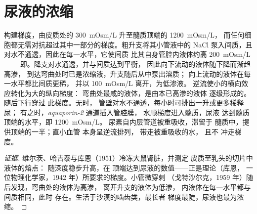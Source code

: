 \section{尿液的浓缩}

\begin{proposition}[逆流倍增]\label{prop:b3:renal-osmoregulation:countercurrent}
构建梯度，由皮质处的 \qty{300}{mOsm/L}
升至髓质顶端的 \qty{1200}{mOsm/L}，
而任何细胞都无需对抗超过其中一部分的梯度。粗升支将其小管液中的 NaCl
泵入间质，且对水不通透，因此在每一水平，它使间质
比其自身管腔内液体约高 \qty{200}{mOsm/L}——
即\emph{}。降支对水通透，并与间质达到平衡，
因此向下流动的液体随下降而渐趋高渗，
到达弯曲处时已是浓缩液，升支随后从中泵出溶质；
向上流动的液体在每一水平都比间质更稀，
并以 \qty{100}{mOsm/L} 离开，为低渗液。
逆流使小的横向效应转化为大的纵向梯度：
弯曲处最咸的液体，是由本已高渗的液体
逐级形成的。随后下行穿过
此梯度。无\emph{}时，
管壁对水不通透，每小时可排出一升或更多稀释尿；
有之时，\emph{aquaporin-2} 通道插入管腔膜，
水顺梯度进入髓质，尿液
达到髓质顶端的水平，即 \qty{1200}{mOsm/L}。
尿素自内层管道被重吸收，滞留于
髓质中，提供顶端的一半；直小血管
本身呈逆流排列，
带走被重吸收的水，
且不
冲走梯度。
\end{proposition}

\begin{proof}[证据]
维尔茨、哈吉泰与库恩（1951）冷冻大鼠肾脏，并测定
皮质至乳头的切片中液体的熔点：
随深度稳步升高，在
顶端达到尿液的数值——正是理论（库恩，
一位物理化学家，1942 年）所要求的梯度。小管微穿刺
（戈特沙尔克，1959 年）随后发现，弯曲处的液体为高渗，
离开升支的液体为低渗，
内液体在每一水平都与间质相同，此时
存在。生活于沙漠的啮齿类，最长者
梯度最陡，尿液也最为浓缩。
\end{proof}

